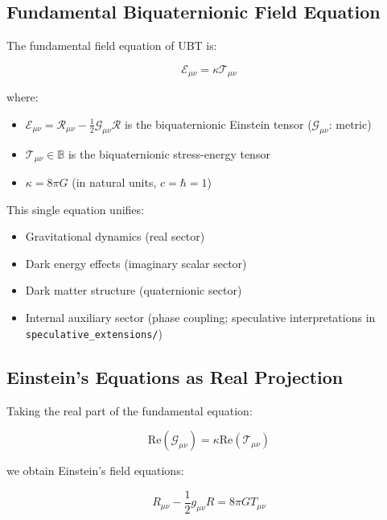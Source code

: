\documentclass[12pt,a4paper]{article}
\begin{document}
\subsection{Fundamental Biquaternionic Field Equation}

The fundamental field equation of UBT is:

\begin{equation}
\label{eq:canonical:fundamental_field_equation}
\boxed{\mathcal{E}_{\mu\nu} = \kappa \mathcal{T}_{\mu\nu}}
\end{equation}

\noindent where:
\begin{itemize}
    \item $\mathcal{E}_{\mu\nu} = \mathcal{R}_{\mu\nu} - \frac{1}{2}\mathcal{G}_{\mu\nu}\mathcal{R}$ is the biquaternionic Einstein tensor ($\mathcal{G}_{\mu\nu}$: metric)
    \item $\mathcal{T}_{\mu\nu} \in \mathbb{B}$ is the biquaternionic stress-energy tensor
    \item $\kappa = 8\pi G$ (in natural units, $c = \hbar = 1$)
\end{itemize}

This single equation unifies:
\begin{itemize}
    \item Gravitational dynamics (real sector)
    \item Dark energy effects (imaginary scalar sector)
    \item Dark matter structure (quaternionic sector)
    \item Internal auxiliary sector (phase coupling; speculative interpretations in \texttt{speculative\_extensions/})
\end{itemize}

\subsection{Einstein's Equations as Real Projection}

Taking the real part of the fundamental equation:

\begin{equation}
\text{Re}(\mathcal{G}_{\mu\nu}) = \kappa \text{Re}(\mathcal{T}_{\mu\nu})
\end{equation}

we obtain Einstein's field equations:

\begin{equation}
\label{eq:canonical:einstein_equations_derived}
\boxed{R_{\mu\nu} - \frac{1}{2} g_{\mu\nu} R = 8\pi G T_{\mu\nu}}
\end{equation}
\end{document}
